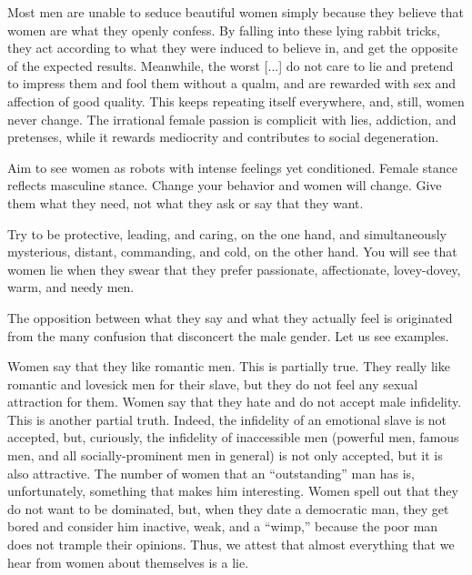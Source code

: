 \par Most men are unable to seduce beautiful women simply because they believe that women are what they openly confess. By falling into these lying rabbit tricks, they act according to what they were induced to believe in, and get the opposite of the expected results. Meanwhile, the worst [...] do not care to lie and pretend to impress them and fool them without a qualm, and are rewarded with sex and affection of good quality. This keeps repeating itself everywhere, and, still, women never change. The irrational female passion is complicit with lies, addiction, and pretenses, while it rewards mediocrity and contributes to social degeneration\footnotemark[15].

\footnotetext[15]{}

\par Aim to see women as robots with intense feelings yet conditioned\footnotemark[16]. Female stance reflects masculine stance\footnotemark[17]. Change your behavior and women will change. Give them what they need, not what they ask or say that they want.

\footnotetext[16]{}
\footnotetext[17]{}

\par Try to be protective, leading, and caring, on the one hand, and simultaneously mysterious, distant, commanding, and cold, on the other hand. You will see that women lie when they swear that they prefer passionate, affectionate, lovey-dovey, warm, and needy men.

\par The opposition between what they say and what they actually feel is originated from the many confusion that disconcert the male gender. Let us see examples.

\par Women say that they like romantic men. This is partially true. They really like romantic and lovesick men for their slave, but they do not feel any sexual attraction for them. Women say that they hate and do not accept male infidelity. This is another partial truth. Indeed, the infidelity of an emotional slave is not accepted, but, curiously, the infidelity of inaccessible men (powerful men, famous men, and all socially-prominent men in general) is not only accepted, but it is also attractive. The number of women that an \enquote{outstanding} man has is, unfortunately, something that makes him interesting. Women spell out that they do not want to be dominated, but, when they date a democratic man, they get bored and consider him inactive, weak, and a \enquote{wimp,} because the poor man does not trample their opinions. Thus, we attest that almost everything that we hear from women about themselves is a lie.

